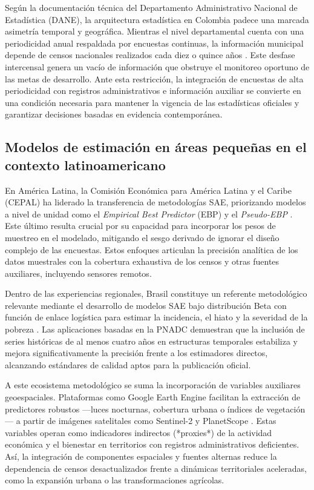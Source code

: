 Según la documentación técnica del Departamento Administrativo Nacional de Estadística (DANE), la arquitectura estadística en Colombia padece una marcada asimetría temporal y geográfica. Mientras el nivel departamental cuenta con una periodicidad anual respaldada por encuestas continuas, la información municipal depende de censos nacionales realizados cada diez o quince años \cite{dane2024}. Este desfase intercensal genera un vacío de información que obstruye el monitoreo oportuno de las metas de desarrollo. Ante esta restricción, la integración de encuestas de alta periodicidad con registros administrativos e información auxiliar se convierte en una condición necesaria para mantener la vigencia de las estadísticas oficiales y garantizar decisiones basadas en evidencia contemporánea.

\subsection{Modelos de estimación en áreas pequeñas en el contexto latinoamericano}

En América Latina, la Comisión Económica para América Latina y el Caribe (CEPAL) ha liderado la transferencia de metodologías SAE, priorizando modelos a nivel de unidad como el \textit{Empirical Best Predictor} (EBP) y el \textit{Pseudo-EBP} \cite{cepal2024}. Este último resulta crucial por su capacidad para incorporar los pesos de muestreo en el modelado, mitigando el sesgo derivado de ignorar el diseño complejo de las encuestas. Estos enfoques articulan la precisión analítica de los datos muestrales con la cobertura exhaustiva de los censos y otras fuentes auxiliares, incluyendo sensores remotos.

Dentro de las experiencias regionales, Brasil constituye un referente metodológico relevante mediante el desarrollo de modelos SAE bajo distribución Beta con función de enlace logística para estimar la incidencia, el hiato y la severidad de la pobreza \cite{moura2021}. Las aplicaciones basadas en la PNADC demuestran que la inclusión de series históricas de al menos cuatro años en estructuras temporales estabiliza y mejora significativamente la precisión frente a los estimadores directos, alcanzando estándares de calidad aptos para la publicación oficial.

A este ecosistema metodológico se suma la incorporación de variables auxiliares geoespaciales. Plataformas como Google Earth Engine facilitan la extracción de predictores robustos ---luces nocturnas, cobertura urbana o índices de vegetación--- a partir de imágenes satelitales como Sentinel-2 y PlanetScope \cite{cepal2024, dane2024}. Estas variables operan como indicadores indirectos (*proxies*) de la actividad económica y el bienestar en territorios con registros administrativos deficientes. Así, la integración de componentes espaciales y fuentes alternas reduce la dependencia de censos desactualizados frente a dinámicas territoriales aceleradas, como la expansión urbana o las transformaciones agrícolas.

